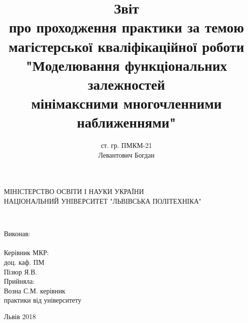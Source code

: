 \documentclass[ukrainian,14pt]{extarticle}
\begin{document}
\title{
	Звіт \\
про проходження практики за темою \\
магістерської кваліфікаційної роботи\\
"Моделювання функціональних залежностей \\
мінімаксними многочленними наближеннями"
}
\author{ст. гр. ПМКМ-21 \\  Левантович Богдан}

\makeatletter
\begin{titlepage}
        \centering
	МІНІСТЕРСТВО ОСВІТИ І НАУКИ УКРАЇНИ \\
	НАЦІОНАЛЬНИЙ УНІВЕРСИТЕТ "ЛЬВІВСЬКА ПОЛІТЕХНІКА"
	\vspace{\fill}

	\@title \\
	\vspace{120pt}
	\raggedright
        \setlength{\leftskip}{11cm}
	Виконав:\\
	\@author\\
        Керівник МКР:\\
       доц. каф. ПМ \\
       Пізюр Я.В.\\
       Прийняла: \\
       Возна С.М. керівник \\
       практики від університету\\
        \setlength{\leftskip}{0cm}
	\vspace{110pt}
	\centering


	Львів 2018
\end{titlepage}
\makeatother
\end{document}
